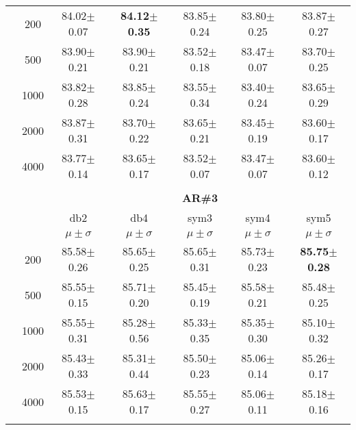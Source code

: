 \begin{table}[H]
\begin{tabular}{|c|c|c c c c c|}
\multicolumn{1}{|c|}{ \multirow{5}{*}{\rotatebox[origin=c]{90}{\textbf{Neurônios}}} }
&200	    &84.02$\pm$0.07	&\textbf{84.12$\pm$0.35}	&83.85$\pm$0.24	&83.80$\pm$0.25	&83.87$\pm$0.27	\\\cline{2-7}
&500	    &83.90$\pm$0.21	&83.90$\pm$0.21	&83.52$\pm$0.18	&83.47$\pm$0.07	&83.70$\pm$0.25	\\\cline{2-7}
&1000	    &83.82$\pm$0.28	&83.85$\pm$0.24	&83.55$\pm$0.34	&83.40$\pm$0.24	&83.65$\pm$0.29	\\\cline{2-7}
&2000	    &83.87$\pm$0.31	&83.70$\pm$0.22	&83.65$\pm$0.21	&83.45$\pm$0.19	&83.60$\pm$0.17	\\\cline{2-7}
&4000	    &83.77$\pm$0.14	&83.65$\pm$0.17 &83.52$\pm$0.07	&83.47$\pm$0.07	&83.60$\pm$0.12	
\\ \midrule
\multicolumn{7}{c}{}\\ 



\cline{3-7}
\multicolumn{2}{c|}{\multirow{3}{*}{}} & \multicolumn{5}{c|}{\textbf{AR\#3}}   \\\cline{3-7} 
\multicolumn{2}{c|}{}  & db2 & db4 & sym3 & sym4 & sym5 \\\cline{3-7}%
\multicolumn{2}{c|}{}& $\mu \pm \sigma$ & $\mu \pm \sigma$ & $\mu \pm \sigma$ & $\mu \pm \sigma$ & $\mu \pm \sigma$ \\\hline

\multicolumn{1}{|c|}{ \multirow{5}{*}{\rotatebox[origin=c]{90}{\textbf{Neurônios}}} }
&200	&85.58$\pm$0.26	&85.65$\pm$0.25	&85.65$\pm$0.31	&85.73$\pm$0.23	&\textbf{85.75$\pm$0.28}	\\\cline{2-7}
&500	&85.55$\pm$0.15	&85.71$\pm$0.20	&85.45$\pm$0.19	&85.58$\pm$0.21	&85.48$\pm$0.25	\\\cline{2-7}
&1000	&85.55$\pm$0.31	&85.28$\pm$0.56	&85.33$\pm$0.35	&85.35$\pm$0.30	&85.10$\pm$0.32	\\\cline{2-7}
&2000	&85.43$\pm$0.33	&85.31$\pm$0.44	&85.50$\pm$0.23	&85.06$\pm$0.14	&85.26$\pm$0.17	\\\cline{2-7}
&4000	&85.53$\pm$0.15	&85.63$\pm$0.17	&85.55$\pm$0.27	&85.06$\pm$0.11	&85.18$\pm$0.16	

\\ \midrule

\multicolumn{7}{c}{}\\ 




\end{tabular}
\end{table}
